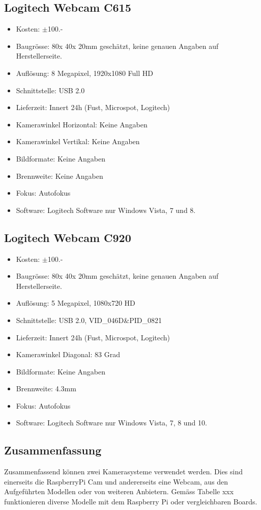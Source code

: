 \subsection{Logitech Webcam C615}
\begin{itemize}
\item Kosten: $\pm$100.-
\item Baugrösse: 80x 40x 20mm geschätzt, keine genauen Angaben auf Herstellerseite.
\item Auflösung: 8 Megapixel, 1920x1080 Full HD
\item Schnittstelle: USB 2.0
\item Lieferzeit: Innert 24h (Fust, Microspot, Logitech)
\item Kamerawinkel Horizontal: Keine Angaben
\item Kamerawinkel Vertikal: Keine Angaben
\item Bildformate: Keine Angaben
\item Brennweite: Keine Angaben
\item Fokus: Autofokus
\item Software: Logitech Software nur Windows Vista, 7 und 8.
\end{itemize}
\subsection{Logitech Webcam C920}
\begin{itemize}
\item Kosten: $\pm$100.-
\item Baugrösse: 80x 40x 20mm geschätzt, keine genauen Angaben auf Herstellerseite.
\item Auflösung: 5 Megapixel, 1080x720 HD
\item Schnittstelle: USB 2.0, VID\_046D{\&}PID\_0821
\item Lieferzeit: Innert 24h (Fust, Microspot, Logitech)
\item Kamerawinkel Diagonal: 83 Grad
\item Bildformate: Keine Angaben
\item Brennweite: 4.3mm
\item Fokus: Autofokus
\item Software: Logitech Software nur Windows Vista, 7, 8 und 10.
\end{itemize}
\subsection{Zusammenfassung}
Zusammenfassend können zwei Kamerasysteme verwendet werden. Dies sind einerseits die RaspberryPi Cam und andererseits eine Webcam, aus den Aufgeführten Modellen oder von weiteren Anbietern. Gemäss Tabelle xxx funktionieren diverse Modelle mit dem Raspberry Pi oder vergleichbaren Boards.
